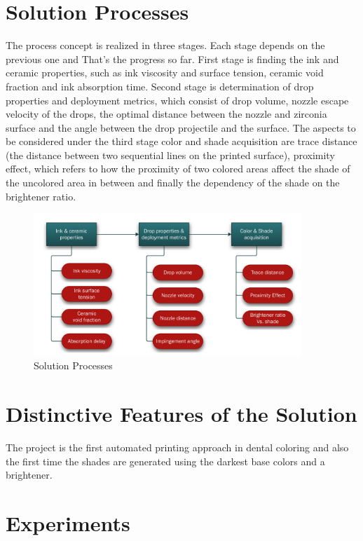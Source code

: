 \chapter{Solution Processes}
\label{sec:Lösungsprozesse}
The process concept is realized in three stages. Each stage depends on the previous one and That’s the progress so far. First stage is finding the ink and ceramic properties, such as ink viscosity and surface tension, ceramic void fraction and ink absorption time. Second stage is determination of drop properties and deployment metrics, which consist of drop volume, nozzle escape velocity of the drops, the optimal distance between the nozzle and zirconia surface and the angle between the drop projectile and the surface. The aspects to be considered under the third stage color and shade acquisition are trace distance (the distance between two sequential lines on the printed surface), proximity effect, which refers to how the proximity of two colored areas affect the shade of the uncolored area in between and finally the dependency of the shade on the brightener ratio.
\newline
\begin{figure}[h]
	\centering
	\includegraphics[width=0.9\textwidth]{grafiken/SolutionProcesses.jpg}
	\caption{Solution Processes}
	\label{fig:SolutionProcesses}
\end{figure} 


\chapter{Distinctive Features of the Solution}
\label{sec:Unterscheidungsmerkmale}
The project is the first automated printing approach in dental coloring and also the first time the shades are generated using the darkest base colors and a brightener.

\chapter{Experiments}

